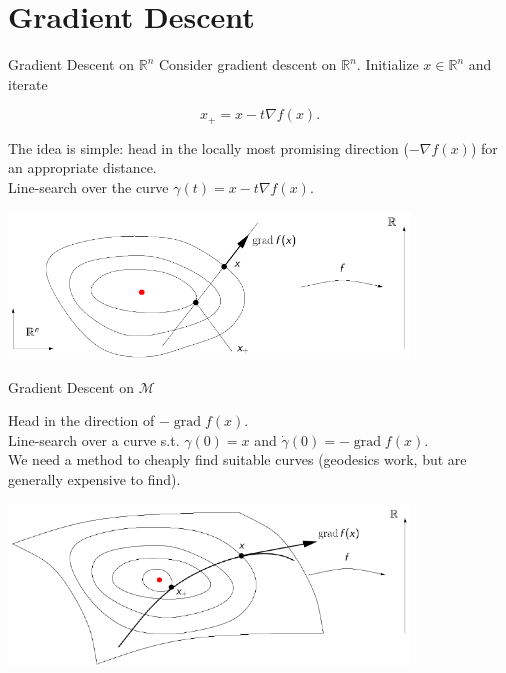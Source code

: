 \documentclass[xcolor=dvipsnames,t]{beamer} %
\newcommand{\reals}{\mathbb{R}}
\begin{document}
\section{Gradient Descent}
\begin{frame}{Gradient Descent on $\reals^n$}
   Consider gradient descent on $\reals^n$.  Initialize $x\in\reals^n$ and iterate

   \[ x_{+}=x - t\nabla f(x). \] 

   \noindent The idea is simple: head in the locally most promising direction ($-\nabla f(x)$) for an appropriate distance.\\[0.5em]

   \noindent Line-search over the curve $\gamma(t) = x - t\nabla f(x)$.


   \begin{center}
      \includegraphics[width=0.8\textwidth]{figures/GD_Rn.pdf}
   \end{center}

\end{frame}

\begin{frame}{Gradient Descent on $\mathcal{M}$}

   Head in the direction of $-\operatorname{grad}f(x)$.\\[0.5em]

   \noindent Line-search over a curve s.t. $\gamma(0)=x$ and $\dot{\gamma}(0)=-\operatorname{grad}f(x)$.\\[0.5em]

   \noindent We need a method to cheaply find suitable curves (geodesics work, but are generally expensive to find).\\
       
   \begin{center}
      \includegraphics[width=0.8\textwidth]{figures/GD_M.pdf}
   \end{center}

\end{frame}
\end{document}
